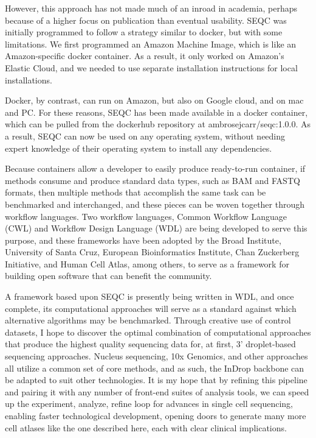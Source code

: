 However, this approach has not made much of an inroad in academia, perhaps because of a higher focus on publication than eventual usability. 
SEQC was initially programmed to follow a strategy similar to docker, but with some limitations.
We first programmed an Amazon Machine Image, which is like an Amazon-specific docker container. 
As a result, it only worked on Amazon's Elastic Cloud, and we needed to use separate installation instructions for local installations. 

Docker, by contrast, can run on Amazon, but also on Google cloud, and on mac and PC.
For these reasons, SEQC has been made available in a docker container, which can be pulled from the dockerhub repository at ambrosejcarr/seqc:1.0.0.
As a result, SEQC can now be used on any operating system, without needing expert knowledge of their operating system to install any dependencies. 

Because containers allow a developer to easily produce ready-to-run container, if methods consume and produce standard data types, such as BAM and FASTQ formats, then multiple methods that accomplish the same task can be benchmarked and interchanged, and these pieces can be woven together through workflow languages. 
Two workflow languages, Common Workflow Language (CWL) and Workflow Design Language (WDL) are being developed to serve this purpose, and these frameworks have been adopted by the Broad Institute, University of Santa Cruz, European Bioinformatics Institute, Chan Zuckerberg Initiative, and Human Cell Atlas, among others, to serve as a framework for building open software that can benefit the community. 

A framework based upon SEQC is presently being written in WDL, and once complete, its computational approaches will serve as a standard against which alternative algorithms may be benchmarked.
Through creative use of control datasets, I hope to discover the optimal combination of computational approaches that produce the highest quality sequencing data for, at first, 3' droplet-based sequencing approaches. 
Nucleus sequencing, 10x Genomics, and other approaches all utilize a common set of core methods, and as such, the InDrop backbone can be adapted to suit other technologies. 
It is my hope that by refining this pipeline and pairing it with any number of front-end suites of analysis tools, we can speed up the experiment, analyze, refine loop for advances in single cell sequencing, enabling faster technological development, opening doors to generate many more cell atlases like the one described here, each with clear clinical implications. 
